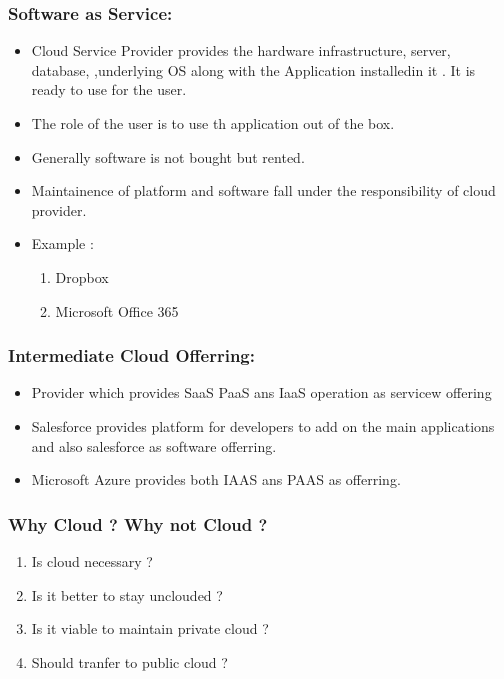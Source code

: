 \documentclass[11pt]{article}
\begin{document}
\subsubsection{Software as Service:}
\label{sec:org8877629}
\begin{itemize}
\item Cloud Service Provider provides the hardware infrastructure, server, database,
 ,underlying OS along with the Application installedin it . It is ready to use
for the user.
\item The role of the user is to use th application out of the box.
\item Generally software is not bought but rented.
\item Maintainence of platform and software fall under the responsibility of cloud
provider.
\item Example :
\begin{enumerate}
\item Dropbox
\item Microsoft Office 365
\end{enumerate}
\end{itemize}


\subsubsection{Intermediate Cloud Offerring:}
\label{sec:orge2d1216}
\begin{itemize}
\item Provider which provides SaaS  PaaS ans IaaS operation as servicew offering
\item Salesforce provides platform for developers to add on the main applications
and also salesforce as software offerring.
\item Microsoft Azure provides both IAAS ans PAAS as offerring.
\end{itemize}

\subsubsection{Why Cloud ? Why not Cloud ?}
\label{sec:org38cc042}
\begin{enumerate}
\item Is cloud necessary ?
\item Is it better to stay unclouded ?
\item Is it viable to maintain private cloud ?
\item Should tranfer to public cloud ?
\end{enumerate}
\end{document}
